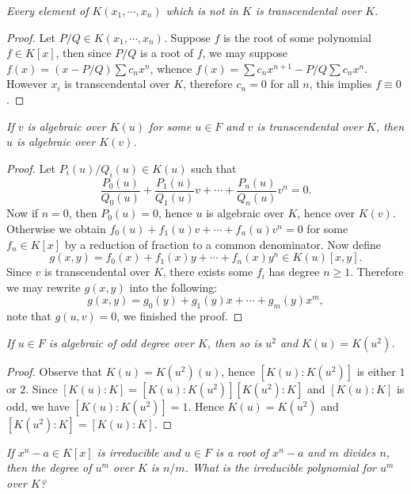 \begin{problem}\em
Every element of $K(x_1,\cdots,x_n)$ which is not in $K$ is transcendental over $K$.
\end{problem}
\begin{proof}
Let $P/Q\in K(x_1,\cdots,x_n)$. Suppose $f$ is the root of some polynomial $f\in K[x]$, then since $P/Q$ is a root of $f$, we may suppose $f(x)=(x-P/Q)\sum c_nx^n$, whence $f(x)=\sum c_nx^{n+1}-P/Q\sum c_nx^n$. However $x_i$ is transcendental over $K$, therefore $c_n=0$ for all $n$, this implies $f\equiv 0$.
\end{proof}
\begin{problem}\em
If $v$ is algebraic over $K(u)$ for some $u\in F$ and $v$ is transcendental over $K$, then $u$ is algebraic over $K(v)$.
\end{problem}
\begin{proof}
Let $P_i(u)/Q_i(u)\in K(u)$ such that 
$$
\frac{P_0\left( u \right)}{Q_0\left( u \right)}+\frac{P_1\left( u \right)}{Q_1\left( u \right)}v+\cdots +\frac{P_n\left( u \right)}{Q_n\left( u \right)}v^n=0.
$$
Now if $n=0$, then $P_0(u)=0$, hence $u$ is algebraic over $K$, hence over $K(v)$. Otherwise we obtain $f_0(u)+f_1(u)v+\cdots+f_n(u)v^n=0$ for some $f_n\in K[x]$ by a reduction of fraction to a common denominator. Now define 
$$
g\left( x,y \right) =f_0\left( x \right) +f_1\left( x \right) y+\cdots +f_n\left( x \right) y^n\in K\left( u \right) \left[ x,y \right] .
$$
Since $v$ is transcendental over $K$, there exists some $f_i$ has degree $n\ge 1$. Therefore we may rewrite $g(x,y)$ into the following: 
$$
g\left( x,y \right) =g_0\left( y \right) +g_1\left( y \right) x+\cdots +g_m\left( y \right) x^m,
$$
note that $g(u,v)=0$, we finished the proof.
\end{proof}
\begin{problem}\em
If $u\in F$ is algebraic of odd degree over $K$, then so is $u^2$ and $K(u)=K(u^2)$.
\end{problem}
\begin{proof}
Observe that $K(u)=K(u^2)(u)$, hence $[K(u):K(u^2)]$ is either $1$ or $2$. Since $[K(u):K]=[K(u):K(u^2)][K(u^2):K]$ and $[K(u):K]$ is odd, we have $[K(u):K(u^2)]=1$. Hence $K(u)=K(u^2)$ and $[K(u^2):K]=[K(u):K]$.
\end{proof}
\begin{problem}\em
If $x^n-a\in K[x]$ is irreducible and $u\in F$ is a root of $x^n-a$ and $m$ divides $n$, then the degree of $u^m$ over $K$ is $n/m$. What is the irreducible polynomial for $u^m$ over $K$?
\end{problem}
